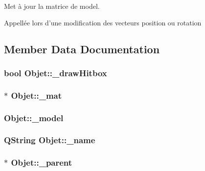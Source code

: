 Met à jour la matrice de model. 

Appellée lors d'une modification des vecteurs position ou rotation 

\subsection{Member Data Documentation}
\hypertarget{class_objet_a953ad7ff9941575d1f18b6d256d2dcdc}{
\subsubsection[{\+\_\+draw\+Hitbox}]{\setlength{\rightskip}{0pt plus 5cm}bool Objet\+::\+\_\+draw\+Hitbox\hspace{0.3cm}{\ttfamily [protected]}}}\label{class_objet_a953ad7ff9941575d1f18b6d256d2dcdc}
\hypertarget{class_objet_aefea82be8c63504190ac63d5e44ff61a}{
\subsubsection[{\+\_\+mat}]{$\ast$ Objet\+::\+\_\+mat\hspace{0.3cm}{\ttfamily [protected]}}}\label{class_objet_aefea82be8c63504190ac63d5e44ff61a}
\hypertarget{class_objet_a1963cca59f62c7a6f69a9c2c461ad9ea}{
\subsubsection[{\+\_\+model}]{ Objet\+::\+\_\+model\hspace{0.3cm}{\ttfamily [protected]}}}\label{class_objet_a1963cca59f62c7a6f69a9c2c461ad9ea}
\hypertarget{class_objet_ac19f568a794dd9387386ee71914a868e}{
\subsubsection[{\+\_\+name}]{\setlength{\rightskip}{0pt plus 5cm}Q\+String Objet\+::\+\_\+name\hspace{0.3cm}{\ttfamily [protected]}}}\label{class_objet_ac19f568a794dd9387386ee71914a868e}
\hypertarget{class_objet_a91c5a50011c3fe9233a645aa767a275f}{
\subsubsection[{\+\_\+parent}]{$\ast$ Objet\+::\+\_\+parent\hspace{0.3cm}{\ttfamily [protected]}}}\label{class_objet_a91c5a50011c3fe9233a645aa767a275f}
